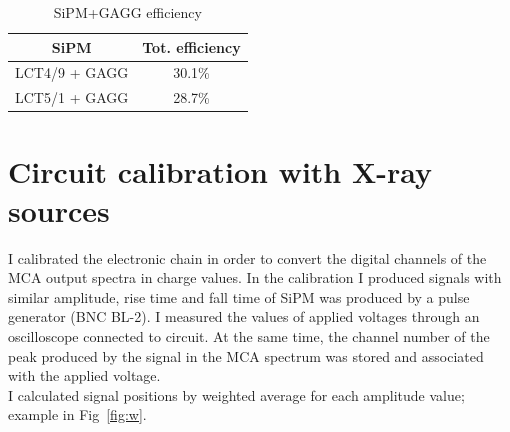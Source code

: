 \documentclass[10pt,a4paper, openany]{book}
\begin{document}
\begin{table}[h]
\begin{tabular}{cc}
\toprule
SiPM & Tot. efficiency \\
\midrule
LCT4/9 + GAGG& 30.1\% \\
LCT5/1 + GAGG& 28.7\% \\
\bottomrule
\end{tabular}
\caption{SiPM+GAGG efficiency}
\label{tab:eff}
\end{table}

\section{Circuit calibration with X-ray sources}
I calibrated the electronic chain in order to convert the digital channels of the MCA output spectra in charge values.
In the calibration I produced signals with similar amplitude, rise time and fall time of SiPM was produced by a pulse generator (BNC BL-2). I measured the values of applied voltages through an oscilloscope connected to circuit. At the same time, the channel number of the peak produced by the signal in the MCA spectrum was stored and associated with the applied voltage.\\
I calculated signal positions by weighted average for each amplitude value; example in Fig~\ref{fig:w}.
\end{document}
